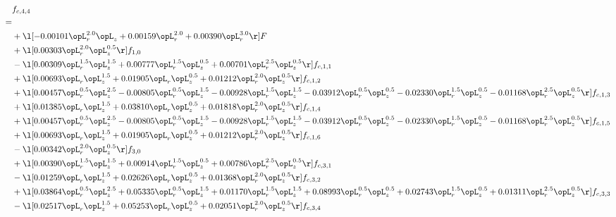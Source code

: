 \begin{alignat}{2} 
\label{eq:f_44_1} 
& f_{c,4,4} \nonumber \\ 
 = \\ 
& + \l[  -0.00101 \opL_r^{2.0} \opL_z +  0.00159 \opL_r^{2.0} +  0.00390 \opL_r^{3.0}  \r] F \nonumber \\ 
& + \l[  0.00303 \opL_r^{2.0} \opL_z^{0.5}  \r] f_{1,0} \nonumber \\ 
& - \l[  0.00309 \opL_r^{1.5} \opL_z^{1.5} +  0.00777 \opL_r^{1.5} \opL_z^{0.5} +  0.00701 \opL_r^{2.5} \opL_z^{0.5}  \r] f_{c,1,1} \nonumber \\ 
& + \l[  0.00693 \opL_r \opL_z^{1.5} +  0.01905 \opL_r \opL_z^{0.5} +  0.01212 \opL_r^{2.0} \opL_z^{0.5}  \r] f_{c,1,2} \nonumber \\ 
& + \l[  0.00457 \opL_r^{0.5} \opL_z^{2.5}   -0.00805 \opL_r^{0.5} \opL_z^{1.5}   -0.00928 \opL_r^{1.5} \opL_z^{1.5}   -0.03912 \opL_r^{0.5} \opL_z^{0.5}   -0.02330 \opL_r^{1.5} \opL_z^{0.5}   -0.01168 \opL_r^{2.5} \opL_z^{0.5}  \r] f_{c,1,3} \nonumber \\ 
& + \l[  0.01385 \opL_r \opL_z^{1.5} +  0.03810 \opL_r \opL_z^{0.5} +  0.01818 \opL_r^{2.0} \opL_z^{0.5}  \r] f_{c,1,4} \nonumber \\ 
& + \l[  0.00457 \opL_r^{0.5} \opL_z^{2.5}   -0.00805 \opL_r^{0.5} \opL_z^{1.5}   -0.00928 \opL_r^{1.5} \opL_z^{1.5}   -0.03912 \opL_r^{0.5} \opL_z^{0.5}   -0.02330 \opL_r^{1.5} \opL_z^{0.5}   -0.01168 \opL_r^{2.5} \opL_z^{0.5}  \r] f_{c,1,5} \nonumber \\ 
& + \l[  0.00693 \opL_r \opL_z^{1.5} +  0.01905 \opL_r \opL_z^{0.5} +  0.01212 \opL_r^{2.0} \opL_z^{0.5}  \r] f_{c,1,6} \nonumber \\ 
& - \l[  0.00342 \opL_r^{2.0} \opL_z^{0.5}  \r] f_{3,0} \nonumber \\ 
& + \l[  0.00390 \opL_r^{1.5} \opL_z^{1.5} +  0.00914 \opL_r^{1.5} \opL_z^{0.5} +  0.00786 \opL_r^{2.5} \opL_z^{0.5}  \r] f_{c,3,1} \nonumber \\ 
& - \l[  0.01259 \opL_r \opL_z^{1.5} +  0.02626 \opL_r \opL_z^{0.5} +  0.01368 \opL_r^{2.0} \opL_z^{0.5}  \r] f_{c,3,2} \nonumber \\ 
& + \l[  0.03864 \opL_r^{0.5} \opL_z^{2.5} +  0.05335 \opL_r^{0.5} \opL_z^{1.5} +  0.01170 \opL_r^{1.5} \opL_z^{1.5} +  0.08993 \opL_r^{0.5} \opL_z^{0.5} +  0.02743 \opL_r^{1.5} \opL_z^{0.5} +  0.01311 \opL_r^{2.5} \opL_z^{0.5}  \r] f_{c,3,3} \nonumber \\ 
& - \l[  0.02517 \opL_r \opL_z^{1.5} +  0.05253 \opL_r \opL_z^{0.5} +  0.02051 \opL_r^{2.0} \opL_z^{0.5}  \r] f_{c,3,4} \nonumber \\ 

\end{alignat}
